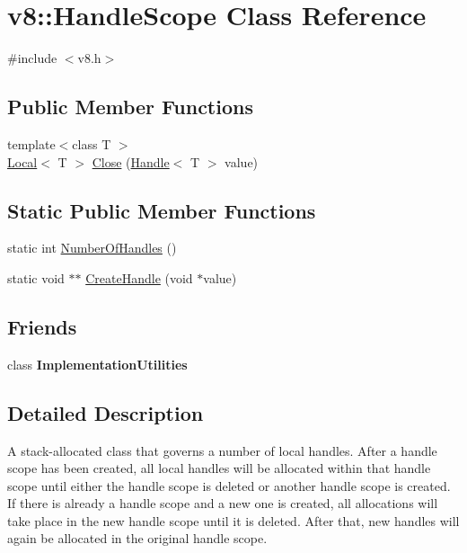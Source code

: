 \hypertarget{classv8_1_1_handle_scope}{}\section{v8\+:\+:Handle\+Scope Class Reference}
\label{classv8_1_1_handle_scope}


{\ttfamily \#include $<$v8.\+h$>$}

\subsection*{Public Member Functions}
\begin{DoxyCompactItemize}
\item 
{\footnotesize template$<$class T $>$ }\\\hyperlink{classv8_1_1_local}{Local}$<$ T $>$ \hyperlink{classv8_1_1_handle_scope_af18b68b6b149e69a05873a20c6fa269c}{Close} (\hyperlink{classv8_1_1_handle}{Handle}$<$ T $>$ value)
\end{DoxyCompactItemize}
\subsection*{Static Public Member Functions}
\begin{DoxyCompactItemize}
\item 
static int \hyperlink{classv8_1_1_handle_scope_abb2d32a75b0468885b7340404050604b}{Number\+Of\+Handles} ()
\item 
static void $\ast$$\ast$ \hyperlink{classv8_1_1_handle_scope_ab3c4482c4e557fdab066c122883df3a5}{Create\+Handle} (void $\ast$value)
\end{DoxyCompactItemize}
\subsection*{Friends}
\begin{DoxyCompactItemize}
\item 
\hypertarget{classv8_1_1_handle_scope_ac7b520085953e146d849e05253267f72}{}class {\bfseries Implementation\+Utilities}\label{classv8_1_1_handle_scope_ac7b520085953e146d849e05253267f72}

\end{DoxyCompactItemize}


\subsection{Detailed Description}
A stack-\/allocated class that governs a number of local handles. After a handle scope has been created, all local handles will be allocated within that handle scope until either the handle scope is deleted or another handle scope is created. If there is already a handle scope and a new one is created, all allocations will take place in the new handle scope until it is deleted. After that, new handles will again be allocated in the original handle scope.

